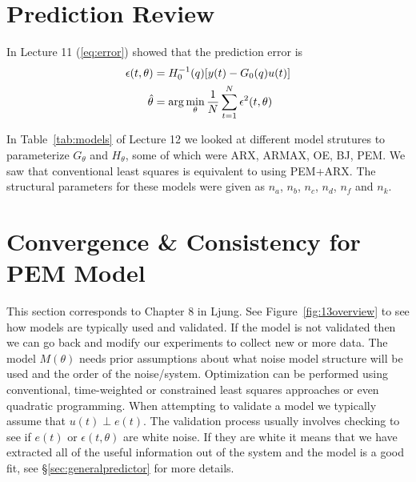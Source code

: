 \mainmatter%
\setcounter{page}{1}

\lectureseries[\course]{\course}

\date{November 10, 2009}

\setaddress%

\setcounter{lecture}{12}
\setcounter{chapter}{12}


\section{Prediction Review}
In Lecture 11 (\ref{eq:error}) showed that the prediction error is
\begin{align*}
\epsilon(t,\theta) &= H_0^{-1}(q)[y(t)-G_0(q)u(t)] \\
\hat{\theta} &= \arg\min_\theta\frac{1}{N}\sum_{t=1}^N\epsilon^2(t,\theta)
\end{align*}

In Table~\ref{tab:models} of Lecture 12 we looked at different model strutures to parameterize $G_\theta$ and $H_\theta$, some of which were ARX, ARMAX, OE, BJ, PEM\@.
We saw that conventional least squares is equivalent to using PEM+ARX\@.
The structural parameters for these models were given as $n_a$, $n_b$, $n_c$, $n_d$, $n_f$ and $n_k$.

\section{Convergence \& Consistency for PEM Model}
\label{sec:13convergence}
This section corresponds to Chapter 8 in Ljung.
See Figure~\ref{fig:13overview} to see how models are typically used and validated.
If the model is not validated then we can go back and modify our experiments to collect new or more data.
The model $M(\theta)$ needs prior assumptions about what noise model structure will be used and the order of the noise/system.
Optimization can be performed using conventional, time-weighted or constrained least squares approaches or even quadratic programming.
When attempting to validate a model we typically assume that $u(t)\perp e(t)$.
The validation process usually involves checking to see if $e(t)$ or $\epsilon(t,\theta)$ are white noise.
If they are white it means that we have extracted all of the useful information out of the system and the model is a good fit, see \S\ref{sec:generalpredictor} for more details.

